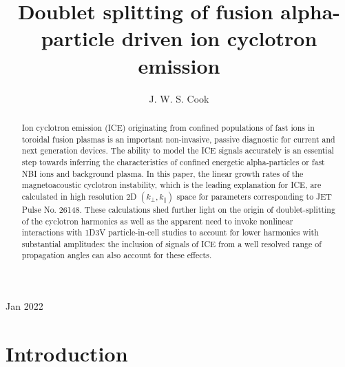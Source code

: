 \documentclass[12pt]{iopart}
\begin{document}
\title[]{Doublet splitting of fusion alpha-particle driven ion cyclotron emission}

\author{J. W. S. Cook}

\address{UKAEA-CCFE, Culham Science Centre, Abingdon, OX14 3DB, UK}
\vspace{10pt}
\begin{indented}
\item[]Jan 2022
\end{indented}

\begin{abstract}
Ion cyclotron emission (ICE) originating from confined populations of fast ions
  in toroidal fusion plasmas is an important non-invasive, passive diagnostic
  for current and next generation devices. The ability to model the ICE signals
  accurately is an essential step towards inferring the characteristics of
  confined energetic alpha-particles or fast NBI ions and background plasma. In
  this paper, the linear growth rates of the magnetoacoustic cyclotron
  instability, which is the leading explanation for ICE, are calculated in high
  resolution 2D $(k_\perp, k_\parallel)$ space for parameters corresponding to
  JET Pulse No. 26148. These calculations shed further light on the origin of
  doublet-splitting of the cyclotron harmonics as well as the apparent need to
  invoke nonlinear interactions with 1D3V particle-in-cell studies to account
  for lower harmonics with substantial amplitudes: the inclusion of signals of
  ICE from a well resolved range of propagation angles can also account for
  these effects.
\end{abstract}

%
%
%
% 
%


\section{Introduction}
\end{document}
